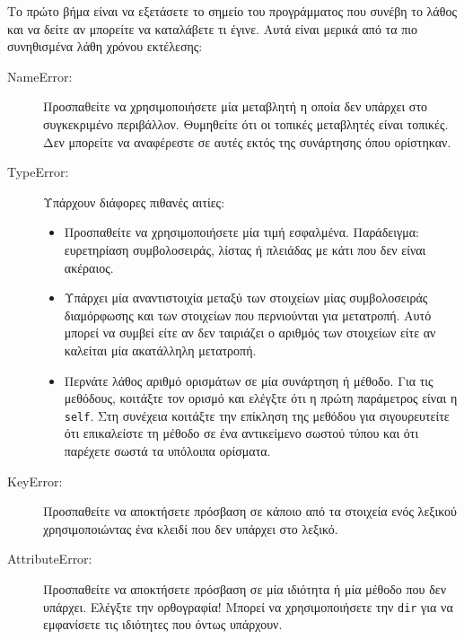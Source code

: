 \documentclass[10pt]{book}
\begin{document}
Το πρώτο βήμα είναι να εξετάσετε το σημείο του προγράμματος που συνέβη το λάθος και να δείτε αν μπορείτε να
καταλάβετε τι έγινε.  Αυτά είναι μερικά από τα πιο συνηθισμένα λάθη χρόνου εκτέλεσης:

\begin{description}

\item[NameError:]  Προσπαθείτε να χρησιμοποιήσετε μία μεταβλητή η οποία δεν υπάρχει στο συγκεκριμένο περιβάλλον.
Θυμηθείτε ότι οι τοπικές μεταβλητές είναι τοπικές. Δεν μπορείτε να αναφέρεστε σε αυτές εκτός της συνάρτησης όπου ορίστηκαν. 

\item[TypeError:]  Υπάρχουν διάφορες πιθανές αιτίες: 

\begin{itemize}

\item  Προσπαθείτε να χρησιμοποιήσετε μία τιμή εσφαλμένα.  Παράδειγμα:  
ευρετηρίαση συμβολοσειράς, λίστας ή πλειάδας με κάτι που δεν είναι ακέραιος.

\item Υπάρχει μία αναντιστοιχία μεταξύ των στοιχείων μίας συμβολοσειράς διαμόρφωσης
και των στοιχείων που περνιούνται για μετατροπή.  Αυτό μπορεί να συμβεί είτε αν δεν ταιριάζει ο αριθμός
των στοιχείων είτε αν καλείται μία ακατάλληλη μετατροπή.

\item Περνάτε λάθος αριθμό ορισμάτων σε μία συνάρτηση ή μέθοδο. Για τις μεθόδους, κοιτάξτε τον ορισμό και ελέγξτε
ότι η πρώτη παράμετρος είναι η {\tt self}. Στη συνέχεια κοιτάξτε την επίκληση της μεθόδου για σιγουρευτείτε ότι
επικαλείστε τη μέθοδο σε ένα αντικείμενο σωστού τύπου και ότι παρέχετε σωστά τα υπόλοιπα ορίσματα.

\end{itemize}
 

\item[KeyError:]  Προσπαθείτε να αποκτήσετε πρόσβαση σε κάποιο από τα στοιχεία ενός λεξικού χρησιμοποιώντας
ένα κλειδί που δεν υπάρχει στο λεξικό. 

\item[AttributeError:]  Προσπαθείτε να αποκτήσετε πρόσβαση σε μία ιδιότητα ή μία μέθοδο που δεν υπάρχει.
Ελέγξτε την ορθογραφία!  Μπορεί να χρησιμοποιήσετε την {\tt dir} για να εμφανίσετε τις ιδιότητες που
όντως υπάρχουν.


\end{description}
\end{document}
